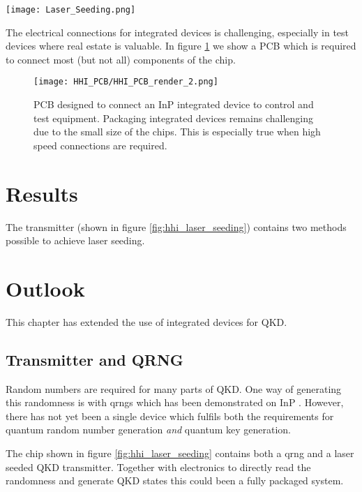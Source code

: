 \begin{sidewaysfigure}
	\centering
	\texttt{[image: Laser\_Seeding.png]}
	\caption[InP laser seeding transmitter with QRNG]{This shows the layout of the laser seeded transmitter device fabricated by HHI. The chip measures \SI[product-units=power]{6x4}{mm} and contains two laser seeding prototype circuits, a homodyne \ac{qrng} and test structure to measure laser and waveguide performances. This demonstrates the complexity and compactness possible in the integrated platform.}
	\label{fig:hhi_laser_seeding}
\end{sidewaysfigure}

The electrical connections for integrated devices is challenging, especially in test devices where real estate is valuable. In figure \ref{fig:hhi_pcb} we show a PCB which is required to connect most (but not all) components of the chip. 

\begin{figure}[tbp]
	\centering
	\texttt{[image: HHI\_PCB/HHI\_PCB\_render\_2.png]}
	\caption[PCB breakout for an InP integrated circuit]{PCB designed to connect an \ac{InP} integrated device to control and test equipment. Packaging integrated devices remains challenging due to the small size of the chips. This is especially true when high speed connections are required.}
	\label{fig:hhi_pcb}
\end{figure}

\section{Results}

The transmitter (shown in figure \ref{fig:hhi_laser_seeding}) contains two methods possible to achieve laser seeding.

\section{Outlook}

This chapter has extended the use of integrated devices for \acl{QKD}.

\subsection{Transmitter and QRNG}

Random numbers are required for many parts of \ac{QKD}. One way of generating this randomness is with \acp{qrng} which has been demonstrated on \ac{InP} \cite{FrancescoThesis,Abellan2016}. However, there has not yet been a single device which fulfils both the requirements for quantum random number generation \textit{and} quantum key generation.

The chip shown in figure \ref{fig:hhi_laser_seeding} contains both a \ac{qrng} and a laser seeded \ac{QKD} transmitter. Together with electronics to directly read the randomness and generate \ac{QKD} states this could been a fully packaged system.

